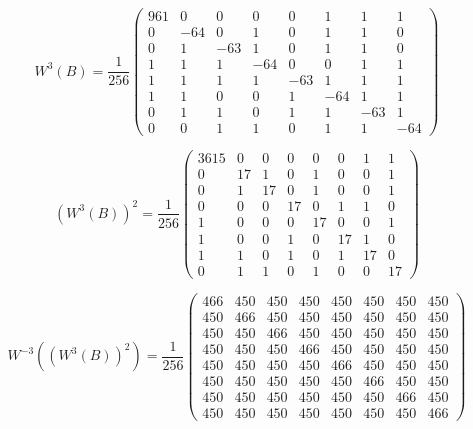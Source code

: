 \begin{equation}
\label {equw3bexamp}
W^3(B) = \frac{1}{256} \left(
\begin{array}{cccccccc}
961 & 0 & 0 & 0 & 0 & 1 & 1 & 1\\
0 & -64 & 0 & 1 & 0 & 1 & 1 & 0\\
0 & 1 & -63 & 1 & 0 & 1 & 1 & 0\\
1 & 1 & 1 & -64 & 0 & 0 & 1 & 1\\
1 & 1 & 1 & 1 & -63 & 1 & 1 & 1\\
1 & 1 & 0 & 0 & 1 & -64 & 1 & 1\\
0 & 1 & 1 & 0 & 1 & 1 & -63 & 1\\
0 & 0 & 1 & 1 & 0 & 1 & 1 & -64
\end{array} \right)
\end{equation}

\begin{equation}
\label {equw3bexamp2}
(W^3(B))^2 = \frac{1}{256} \left(
\begin{array}{cccccccc}
3615 & 0 & 0 & 0 & 0 & 0 & 1 & 1\\
0 & 17 & 1 & 0 & 1 & 0 & 0 & 1\\
0 & 1 & 17 & 0 & 1 & 0 & 0 & 1\\
0 & 0 & 0 & 17 & 0 & 1 & 1 & 0\\
1 & 0 & 0 & 0 & 17 & 0 & 0 & 1\\
1 & 0 & 0 & 1 & 0 & 17 & 1 & 0\\
1 & 1 & 0 & 1 & 0 & 1 & 17 & 0\\
0 & 1 & 1 & 0 & 1 & 0 & 0 & 17 
\end{array} \right)
\end{equation}

\begin{equation}
\label {equ:invw3bexamp2}
W^{-3}((W^3(B))^2) = \frac{1}{256} \left(
\begin{array}{cccccccc}
466 & 450 & 450 & 450 & 450 & 450 & 450 & 450\\
450 & 466 & 450 & 450 & 450 & 450 & 450 & 450\\
450 & 450 & 466 & 450 & 450 & 450 & 450 & 450\\
450 & 450 & 450 & 466 & 450 & 450 & 450 & 450\\
450 & 450 & 450 & 450 & 466 & 450 & 450 & 450\\
450 & 450 & 450 & 450 & 450 & 466 & 450 & 450\\
450 & 450 & 450 & 450 & 450 & 450 & 466 & 450\\
450 & 450 & 450 & 450 & 450 & 450 & 450 & 466
\end{array} \right)
\end{equation}

